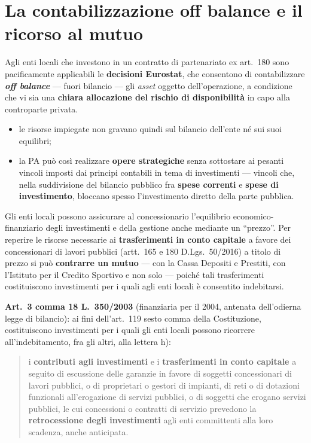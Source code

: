 
\section{La contabilizzazione off balance e il ricorso al mutuo}


Agli enti locali che investono in un contratto di partenariato ex art.\ 180 sono pacificamente
applicabili le \textbf{decisioni Eurostat}, che consentono di contabilizzare \textbf{\textit{off
balance}} --- fuori bilancio --- gli \textit{asset} oggetto dell'operazione, a condizione che vi
sia una \textbf{chiara allocazione del rischio di disponibilità} in capo alla controparte privata.

\begin{itemize}
  \item le risorse impiegate non gravano quindi sul bilancio dell'ente né sui suoi equilibri;
  \item la PA può così realizzare \textbf{opere strategiche} senza sottostare ai pesanti vincoli
    imposti dai principi contabili in tema di investimenti --- vincoli che, nella suddivisione del
    bilancio pubblico fra \textbf{spese correnti} e \textbf{spese di investimento}, bloccano spesso
    l'investimento diretto della parte pubblica.
\end{itemize}


Gli enti locali possono assicurare al concessionario l'equilibrio economico-finanziario degli
investimenti e della gestione anche mediante un ``prezzo''. Per reperire le risorse necessarie ai
\textbf{trasferimenti in conto capitale} a favore dei concessionari di lavori pubblici (artt.\ 165
e 180 D.Lgs.\ 50/2016) a titolo di prezzo si può \textbf{contrarre un mutuo} --- con la Cassa
Depositi e Prestiti, con l'Istituto per il Credito Sportivo e non solo --- poiché tali
trasferimenti costituiscono investimenti per i quali agli enti locali è consentito indebitarsi.

\textbf{Art.\ 3 comma 18 L.\ 350/2003} (finanziaria per il 2004, antenata dell'odierna legge di
bilancio): ai fini dell'art.\ 119 sesto comma della Costituzione, costituiscono investimenti per i
quali gli enti locali possono ricorrere all'indebitamento, fra gli altri, alla lettera h):

\begin{quote}
i \textbf{contributi agli investimenti} e i \textbf{trasferimenti in conto capitale} a seguito di
escussione delle garanzie in favore di soggetti concessionari di lavori pubblici, o di proprietari
o gestori di impianti, di reti o di dotazioni funzionali all'erogazione di servizi pubblici, o di
soggetti che erogano servizi pubblici, le cui concessioni o contratti di servizio prevedono la
\textbf{retrocessione degli investimenti} agli enti committenti alla loro scadenza, anche
anticipata.
\end{quote}


